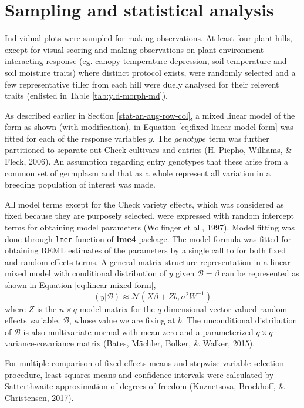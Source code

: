 \documentclass[12pt,oneside]{dukestatscithesis} %
\theoremstyle{definition}
\theoremstyle{definition}
\theoremstyle{definition}
\theoremstyle{remark}
\begin{document}
\section{Sampling and statistical
analysis}\label{sampling-and-statistical-analysis}

Individual plots were sampled for making observations. At least four
plant hills, except for visual scoring and making observations on
plant-environment interacting response (eg. canopy temperature
depression, soil temperature and soil moisture traits) where distinct
protocol exists, were randomly selected and a few representative tiller
from each hill were duely analysed for their relevent traits (enlisted
in Table \ref{tab:yld-morph-md}).

As described earlier in Section \ref{stat-an-aug-row-col}, a mixed
linear model of the form as shown (with modification), in Equation
\eqref{eq:fixed-linear-model-form} was fitted for each of the response
variables \(y\). The \(genotype\) term was further partitioned to
separate out Check cultivars and entries (H. Piepho, Williams, \& Fleck,
2006). An assumption regarding entry genotypes that these arise from a
common set of germplasm and that as a whole represent all variation in a
breeding population of interest was made.

All model terms except for the Check variety effects, which was
considered as fixed because they are purposely selected, were expressed
with random intercept terms for obtaining model parameters (Wolfinger et
al., 1997). Model fitting was done through \texttt{lmer} function of
\textbf{lme4} package. The model formula was fitted for obtaining REML
estimates of the parameters by a single call to for both fixed and
random effects terms. A general matrix structure representation in a
linear mixed model with conditional distribution of \(y\) given
\(\mathcal{B} =\beta\) can be represented as shown in Equation
\eqref{eq:linear-mixed-form},
\begin{equation}
(y|\mathcal{B}) \approx \mathcal{N}(X\beta + Zb, \sigma^{2}W^{-1})
\label{eq:linear-mixed-form}
\end{equation}
where \(Z\) is the \(n \times q\) model matrix for the \(q\)-dimensional
vector-valued random effects variable, \(\mathcal{B}\), whose value we
are fixing at \(b\). The unconditional distribution of \(\mathcal{B}\)
is also multivariate normal with mean zero and a parameterized
\(q \times q\) variance-covariance matrix (Bates, Mächler, Bolker, \&
Walker, 2015).

For multiple comparison of fixed effects means and stepwise variable
selection procedure, least squares means and confidence intervals were
calculated by Satterthwaite approximation of degrees of freedom
(Kuznetsova, Brockhoff, \& Christensen, 2017).
\end{document}
